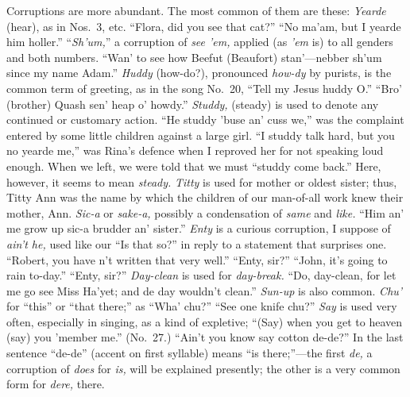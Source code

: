 \documentclass[a5paper,10pt]{book}
\begin{document}
Corruptions are more abundant.  The most common of them are these:
\emph{Yearde} (hear), as in Nos.~3, etc.  ``Flora, did you see that
cat?''  ``No ma'am, but I yearde him holler.''  ``\emph{Sh'um,}'' a
corruption of \emph{see 'em,} applied (as \emph{'em} is) to all
genders and both numbers.  ``Wan' to see how Beefut (Beaufort)
stan'---nebber sh'um since my name Adam.''  \emph{Huddy} (how-do?),
pronounced \emph{how-dy} by purists, is the common term of greeting,
as in the song No.~20, ``Tell my Jesus huddy O.''  ``Bro' (brother)
Quash sen' heap o' howdy.''  \emph{Studdy,} (steady) is used to denote
any continued or customary action.  ``He studdy 'buse an' cuss we,''
was the complaint entered by some little children against a large
girl.  ``I studdy talk hard, but you no yearde me,'' was Rina's
defence when I reproved her for not speaking loud enough.  When we
left, we were told that we must ``studdy come back.''  Here, however,
it seems to mean \emph{steady.}  \emph{Titty} is used for mother or
oldest sister; thus, Titty Ann was the name by which the children of
our man-of-all work knew their mother, Ann.  \emph{Sic-a} or
\emph{sake-a,} possibly a condensation of \emph{same} and \emph{like.}
``Him an' me grow up sic-a brudder an' sister.''  \emph{Enty} is a
curious corruption, I suppose of \emph{ain't he,} used like our ``Is
that so?'' in reply to a statement that surprises one.  ``Robert, you
have n't written that very well.''  ``Enty, sir?''  ``John, it's going
to rain to-day.''  ``Enty, sir?''  \emph{Day-clean} is used for
\emph{day-break.}  ``Do, day-clean, for let me go see Miss Ha'yet; and
de day wouldn't clean.''  \emph{Sun-up} is also common.  \emph{Chu'}
for ``this'' or ``that there;'' as ``Wha' chu?''  ``See one knife
chu?''  \emph{Say} is used very often, especially in singing, as a
kind of expletive; ``(Say) when you get to heaven (say) you 'member
me.'' (No.~27.)  ``Ain't you know say cotton de-de?''  In the last
sentence ``de-de'' (accent on first syllable) means ``is
there;''---the first \emph{de,} a corruption of \emph{does} for
\emph{is,} will be explained presently; the other is a very common
form for \emph{dere,} there.
\end{document}
